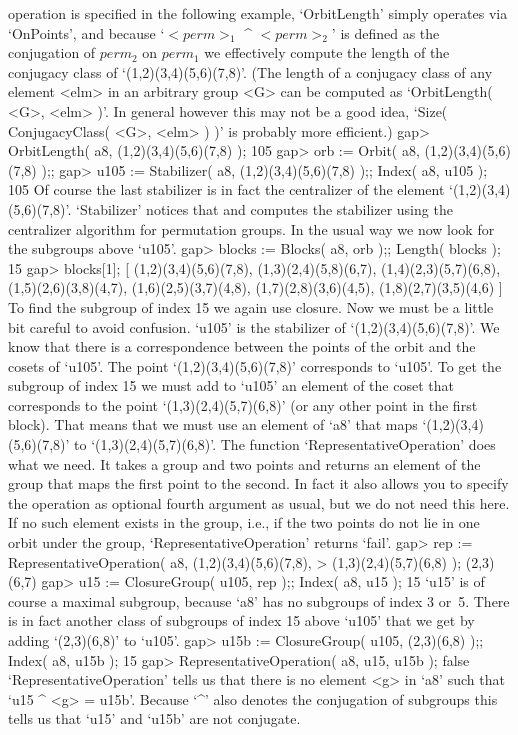 operation is specified  in the  following example, `OrbitLength'   simply
operates via `OnPoints', and because `$<perm>_1$ ^ $<perm>_2$' is defined
as the conjugation  of  $perm_2$ on $perm_1$  we  effectively compute the
length of the conjugacy class of `(1,2)(3,4)(5,6)(7,8)'. (The length of a
conjugacy class of any  element <elm> in an  arbitrary  group <G>  can be
computed as `OrbitLength( <G>, <elm> )'. In general  however this may not
be a good idea, `Size(  ConjugacyClass( <G>, <elm> )  )' is probably more
efficient.)
\beginexample
    gap> OrbitLength( a8, (1,2)(3,4)(5,6)(7,8) );
    105
    gap> orb := Orbit( a8, (1,2)(3,4)(5,6)(7,8) );;
    gap> u105 := Stabilizer( a8, (1,2)(3,4)(5,6)(7,8) );; Index( a8, u105 );
    105 
\endexample
Of course the  last stabilizer is in  fact the centralizer of the element
`(1,2)(3,4)(5,6)(7,8)'.  `Stabilizer' notices    that and computes    the
stabilizer using the centralizer algorithm for permutation groups. In the
usual way we now look for the subgroups above `u105'.
\beginexample
    gap> blocks := Blocks( a8, orb );; Length( blocks );
    15
    gap> blocks[1];
    [ (1,2)(3,4)(5,6)(7,8), (1,3)(2,4)(5,8)(6,7), (1,4)(2,3)(5,7)(6,8),
      (1,5)(2,6)(3,8)(4,7), (1,6)(2,5)(3,7)(4,8), (1,7)(2,8)(3,6)(4,5),
      (1,8)(2,7)(3,5)(4,6) ]
\endexample
To find the subgroup of index 15 we  again use closure. Now  we must be a
little bit  careful to avoid    confusion. `u105' is the  stabilizer   of
`(1,2)(3,4)(5,6)(7,8)'. We  know  that there is  a correspondence between
the  points  of  the   orbit and  the   cosets  of  `u105'.   The   point
`(1,2)(3,4)(5,6)(7,8)' corresponds   to `u105'.  To get  the  subgroup of
index 15 we  must add to `u105' an  element of the coset that corresponds
to the   point `(1,3)(2,4)(5,7)(6,8)' (or any other   point  in the first
block).  That means   that  we must  use  an  element of `a8'  that  maps
`(1,2)(3,4)(5,6)(7,8)' to  `(1,3)(2,4)(5,7)(6,8)'.        The    function
`RepresentativeOperation'   does what we need. It   takes a group and two
points and returns an  element of the group that  maps the first point to
the   second. In fact it   also allows you  to   specify the operation as
optional fourth argument as usual,  but we do  not need this here. If  no
such element exists in the  group, i.e., if the  two points do not lie in
one orbit under the group, `RepresentativeOperation' returns `fail'.
\beginexample
    gap> rep := RepresentativeOperation( a8, (1,2)(3,4)(5,6)(7,8),
    >                                        (1,3)(2,4)(5,7)(6,8) );
    (2,3)(6,7)
    gap> u15 := ClosureGroup( u105, rep );; Index( a8, u15 );
    15 
\endexample
`u15' is of course a maximal  subgroup, because `a8'  has no subgroups of
index 3 or~5.  There is in fact  another  class of subgroups  of index 15
above `u105' that we get by adding `(2,3)(6,8)' to `u105'.
\beginexample
    gap> u15b := ClosureGroup( u105, (2,3)(6,8) );; Index( a8, u15b );
    15 
    gap> RepresentativeOperation( a8, u15, u15b );
    false 
\endexample
`RepresentativeOperation' tells us that  there is no  element <g> in `a8'
such that `u15 ^ <g> = u15b'. Because `^' also denotes the conjugation of
subgroups this tells us  that  `u15' and  `u15b' are not  conjugate.

